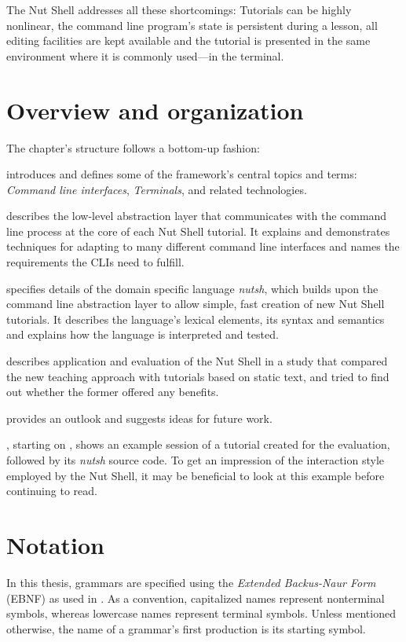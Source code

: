 \documentclass[paper=a4,abstract=on,cleardoublepage=empty,numbers=noenddot,toc=bib,12pt,appendixprefix=true]{scrreprt}
\begin{document}
The Nut Shell addresses all these shortcomings: Tutorials can be highly nonlinear, the command line program's state is persistent during a lesson, all editing facilities are kept available and the tutorial is presented in the same environment where it is commonly used---in the terminal.

\section{Overview and organization}

The chapter's structure follows a bottom-up fashion:

 introduces and defines some of the framework's central topics and terms: \emph{Command line interfaces}, \emph{Terminals}, and related technologies.

 describes the low-level abstraction layer that communicates with the command line process at the core of each Nut Shell tutorial. It explains and demonstrates techniques for adapting to many different command line interfaces and names the requirements the CLIs need to fulfill.

 specifies details of the domain specific language \emph{nutsh}, which builds upon the command line abstraction layer to allow simple, fast creation of new Nut Shell tutorials. It describes the language's lexical elements, its syntax and semantics and explains how the language is interpreted and tested.

 describes application and evaluation of the Nut Shell in a study that compared the new teaching approach with tutorials based on static text, and tried to find out whether the former offered any benefits.

 provides an outlook and suggests ideas for future work.

, starting on , shows an example session of a tutorial created for the evaluation, followed by its \emph{nutsh} source code. To get an impression of the interaction style employed by the Nut Shell, it may be beneficial to look at this example before continuing to read.

\section{Notation}
\label{sec:ebnf}

In this thesis, grammars are specified using the \emph{Extended Backus-Naur Form} (EBNF) as used in \cite{wirth77}. As a convention, capitalized names represent nonterminal symbols, whereas lowercase names represent terminal symbols. Unless mentioned otherwise, the name of a grammar's first production is its starting symbol.
\end{document}
